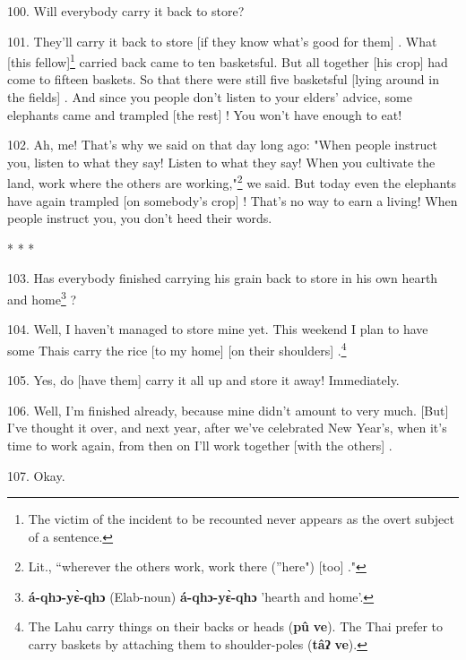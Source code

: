 100. Will everybody carry it back to store?

101. They'll carry it back to store [if they know what's good for them] . What
[this fellow]\footnote{The victim of the incident to be recounted never appears as the overt subject of a sentence.} carried back came to ten basketsful. But all together [his
crop] had come to fifteen baskets. So that there were still five basketsful [lying
around in the fields] . And since you people don't listen to your elders' advice,
some elephants came and trampled [the rest] ! You won't have enough to eat!

102. Ah, me! That's why we said on that day long ago: "When people instruct
you, listen to what they say! Listen to what they say! When you cultivate the land,
work where the others are working,"\footnote{Lit., ``wherever the others work, work there (''here") [too] ."} we said. But today even the elephants
have again trampled [on somebody's crop] ! That's no way to earn a living! When
people instruct you, you don't heed their words.

\begin{center}
* * *
\end{center}

103. Has everybody finished carrying his grain back to store in his own hearth
and home\footnote{\textbf{á-qhɔ-yɛ̀-qhɔ} (Elab-noun) \textbf{á-qhɔ-yɛ̀-qhɔ} 'hearth and home'.} ?

104. Well, I haven't managed to store mine yet. This weekend I plan to have some
Thais carry the rice [to my home] [on their shoulders] .\footnote{The Lahu carry things on their backs or heads (\textbf{pû} \textbf{ve}). The Thai prefer to carry baskets by attaching them to shoulder-poles (\textbf{tâʔ} \textbf{ve}).}

105. Yes, do [have them] carry it all up and store it away! Immediately.

106. Well, I'm finished already, because mine didn't amount to very much. [But]
I've thought it over, and next year, after we've celebrated New Year's, when it's
time to work again, from then on I'll work together [with the others] .

107. Okay.

